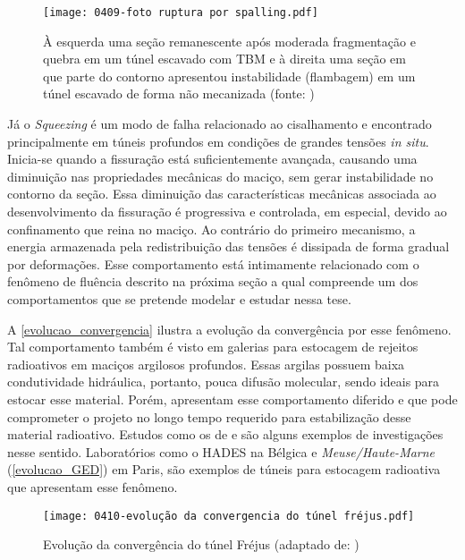\begin{figure}[H]
	\begin{center}
		\texttt{[image: 0409-foto ruptura por spalling.pdf]}
	\end{center}
	\caption{\label{foto_spalling}À esquerda uma seção remanescente após moderada fragmentação e quebra em um túnel escavado com TBM e à direita uma seção em que parte do contorno apresentou instabilidade (flambagem) em um túnel escavado de forma não mecanizada (fonte: )}
\end{figure}

Já o \textit{Squeezing} é um modo de falha relacionado ao cisalhamento e encontrado principalmente em túneis profundos em condições de grandes tensões \textit{in situ}. Inicia-se quando a fissuração está suficientemente avançada, causando uma diminuição nas propriedades mecânicas do maciço, sem gerar instabilidade no contorno da seção. Essa diminuição das características mecânicas associada ao desenvolvimento da fissuração é progressiva e controlada, em especial, devido ao confinamento que reina no maciço. Ao contrário do primeiro mecanismo, a energia armazenada pela redistribuição das tensões é dissipada de forma gradual por deformações. Esse comportamento está intimamente relacionado com o fenômeno de fluência descrito na próxima seção a qual compreende um dos comportamentos que se pretende modelar e estudar nessa tese.

A \autoref{evolucao_convergencia} ilustra a evolução da convergência por esse fenômeno. Tal comportamento também é visto em galerias para estocagem de rejeitos radioativos em maciços argilosos profundos. Essas argilas possuem baixa condutividade hidráulica, portanto, pouca difusão molecular, sendo ideais para estocar esse material. Porém, apresentam esse comportamento diferido e que pode comprometer o projeto no longo tempo requerido para estabilização desse material radioativo. Estudos como os de  e  são alguns exemplos de investigações nesse sentido. Laboratórios como o HADES na Bélgica e \textit{Meuse/Haute-Marne} (\autoref{evolucao_GED}) em Paris, são exemplos de túneis para estocagem radioativa que apresentam esse fenômeno.

\begin{figure}[H]
	\begin{center}
		\texttt{[image: 0410-evolução da convergencia do túnel fréjus.pdf]}
	\end{center}
	\caption{\label{evolucao_convergencia}Evolução da convergência do túnel Fréjus (adaptado de: )}
\end{figure}

